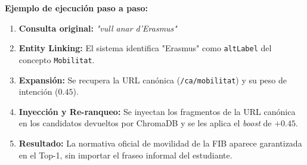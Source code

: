 \textbf{Ejemplo de ejecución paso a paso:}
\begin{enumerate}
    \item \textbf{Consulta original:} \textit{"vull anar d'Erasmus"}
    \item \textbf{Entity Linking:} El sistema identifica "Erasmus" como \texttt{altLabel} del concepto \texttt{Mobilitat}.
    \item \textbf{Expansión:} Se recupera la URL canónica (\texttt{/ca/mobilitat}) y su peso de intención ($0.45$).
    \item \textbf{Inyección y Re-ranqueo:} Se inyectan los fragmentos de la URL canónica en los candidatos devueltos por ChromaDB y se les aplica el \textit{boost} de $+0.45$.
    \item \textbf{Resultado:} La normativa oficial de movilidad de la FIB aparece garantizada en el Top-1, sin importar el fraseo informal del estudiante.
\end{enumerate}